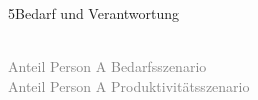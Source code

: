 \documentclass[xcolor=table,9pt,aspectratio=169]{beamer}
\begin{document}
\begin{frame}{\vspace*{10mm}5\hspace*{1em}Bedarf und Verantwortung}
\begin{multicols}{2}
   \begin{center}
      \\
      \textcolor{gray}{Anteil Person A Bedarfsszenario}
      \\
      \textcolor{gray}{Anteil Person A Produktivitätsszenario}
   \end{center}
\end{multicols}
\end{frame}
\end{document}
